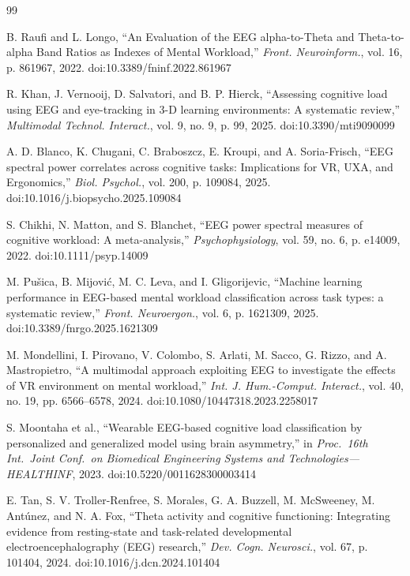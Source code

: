 \documentclass[conference]{IEEEtran}
\begin{document}
\begin{thebibliography}{99}
\footnotesize


B. Raufi and L. Longo, ``An Evaluation of the EEG alpha-to-Theta and Theta-to-alpha Band Ratios as Indexes of Mental Workload,'' \emph{Front. Neuroinform.}, vol. 16, p. 861967, 2022. doi:10.3389/fninf.2022.861967

R. Khan, J. Vernooij, D. Salvatori, and B. P. Hierck, ``Assessing cognitive load using EEG and eye-tracking in 3-D learning environments: A systematic review,'' \emph{Multimodal Technol. Interact.}, vol. 9, no. 9, p. 99, 2025. doi:10.3390/mti9090099

A. D. Blanco, K. Chugani, C. Braboszcz, E. Kroupi, and A. Soria-Frisch, ``EEG spectral power correlates across cognitive tasks: Implications for VR, UXA, and Ergonomics,'' \emph{Biol. Psychol.}, vol. 200, p. 109084, 2025. doi:10.1016/j.biopsycho.2025.109084

S. Chikhi, N. Matton, and S. Blanchet, ``EEG power spectral measures of cognitive workload: A meta-analysis,'' \emph{Psychophysiology}, vol. 59, no. 6, p. e14009, 2022. doi:10.1111/psyp.14009

M. Pušica, B. Mijović, M. C. Leva, and I. Gligorijevic, ``Machine learning performance in EEG-based mental workload classification across task types: a systematic review,'' \emph{Front. Neuroergon.}, vol. 6, p. 1621309, 2025. doi:10.3389/fnrgo.2025.1621309

M. Mondellini, I. Pirovano, V. Colombo, S. Arlati, M. Sacco, G. Rizzo, and A. Mastropietro, ``A multimodal approach exploiting EEG to investigate the effects of VR environment on mental workload,'' \emph{Int. J. Hum.-Comput. Interact.}, vol. 40, no. 19, pp. 6566--6578, 2024. doi:10.1080/10447318.2023.2258017

S. Moontaha et al., ``Wearable EEG-based cognitive load classification by personalized and generalized model using brain asymmetry,'' in \emph{Proc.\ 16th Int.\ Joint Conf.\ on Biomedical Engineering Systems and Technologies---HEALTHINF}, 2023. doi:10.5220/0011628300003414

E. Tan, S. V. Troller-Renfree, S. Morales, G. A. Buzzell, M. McSweeney, M. Antúnez, and N. A. Fox, ``Theta activity and cognitive functioning: Integrating evidence from resting-state and task-related developmental electroencephalography (EEG) research,'' \emph{Dev. Cogn. Neurosci.}, vol. 67, p. 101404, 2024. doi:10.1016/j.dcn.2024.101404


\end{thebibliography}
\end{document}
